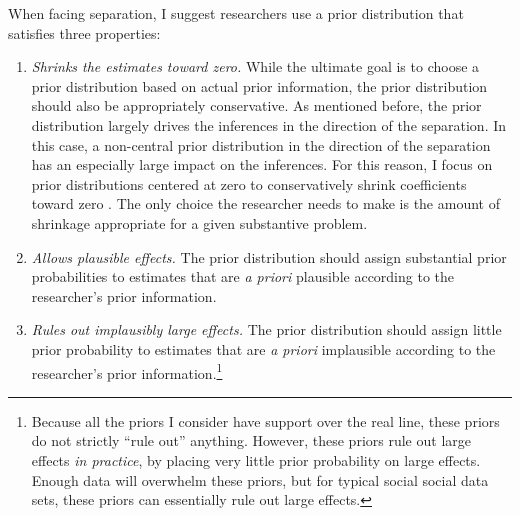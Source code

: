 \documentclass[12pt]{article}
\begin{document}
When facing separation, I suggest researchers use a prior distribution that satisfies three properties:
\begin{enumerate}
\item \emph{Shrinks the estimates toward zero.} 
While the ultimate goal is to choose a prior distribution based on actual prior information, the prior distribution should also be appropriately conservative.
As mentioned before, the prior distribution largely drives the inferences in the direction of the separation. 
In this case, a non-central prior distribution in the direction of the separation has an especially large impact on the inferences. 
For this reason, I focus on prior distributions centered at zero to conservatively shrink coefficients toward zero \citep{GelmanJakulin2007}. 
The only choice the researcher needs to make is the amount of shrinkage appropriate for a given substantive problem.
\item \emph{Allows plausible effects.} 
The prior distribution should assign substantial prior probabilities to estimates that are \textit{a priori} plausible according to the researcher's prior information.
\item \emph{Rules out implausibly large effects.} 
The prior distribution should assign little prior probability to estimates that are \textit{a priori} implausible according to the researcher's prior information.\footnote{
Because all the priors I consider have support over the real line, these priors do not strictly ``rule out'' anything. 
However, these priors rule out large effects \textit{in practice}, by placing very little prior probability on large effects.
 Enough data will overwhelm these priors, but for typical social social data sets, these priors can essentially rule out large effects.}
\end{enumerate}
\end{document}

